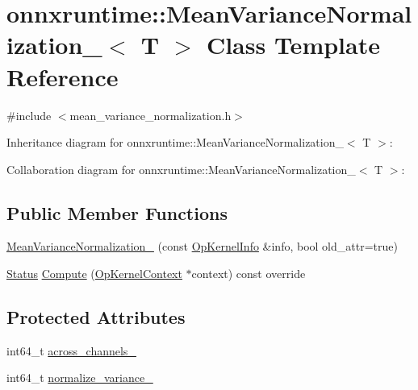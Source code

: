 \hypertarget{classonnxruntime_1_1MeanVarianceNormalization__0}{}\section{onnxruntime\+:\+:Mean\+Variance\+Normalization\+\_$<$ T $>$ Class Template Reference}
\label{classonnxruntime_1_1MeanVarianceNormalization__0}


{\ttfamily \#include $<$mean\+\_\+variance\+\_\+normalization.\+h$>$}



Inheritance diagram for onnxruntime\+:\+:Mean\+Variance\+Normalization\+\_$<$ T $>$\+:


Collaboration diagram for onnxruntime\+:\+:Mean\+Variance\+Normalization\+\_$<$ T $>$\+:
\subsection*{Public Member Functions}
\begin{DoxyCompactItemize}
\item 
\mbox{\hyperlink{classonnxruntime_1_1MeanVarianceNormalization__0_af58b4b2116a13816502a6fe73c739b9e}{Mean\+Variance\+Normalization\+\_}} (const \mbox{\hyperlink{classonnxruntime_1_1OpKernelInfo}{Op\+Kernel\+Info}} \&info, bool old\+\_\+attr=true)
\item 
\mbox{\hyperlink{classonnxruntime_1_1common_1_1Status}{Status}} \mbox{\hyperlink{classonnxruntime_1_1MeanVarianceNormalization__0_a8a48b8e2a5b93f7c73b0b2f6df7e25ef}{Compute}} (\mbox{\hyperlink{classonnxruntime_1_1OpKernelContext}{Op\+Kernel\+Context}} $\ast$context) const override
\end{DoxyCompactItemize}
\subsection*{Protected Attributes}
\begin{DoxyCompactItemize}
\item 
int64\+\_\+t \mbox{\hyperlink{classonnxruntime_1_1MeanVarianceNormalization__0_a1a88cf5276e9398eb94fda2129dcc381}{across\+\_\+channels\+\_\+}}
\item 
int64\+\_\+t \mbox{\hyperlink{classonnxruntime_1_1MeanVarianceNormalization__0_a32898f49c342b8ffd0ed6c55c922500a}{normalize\+\_\+variance\+\_\+}}
\end{DoxyCompactItemize}
